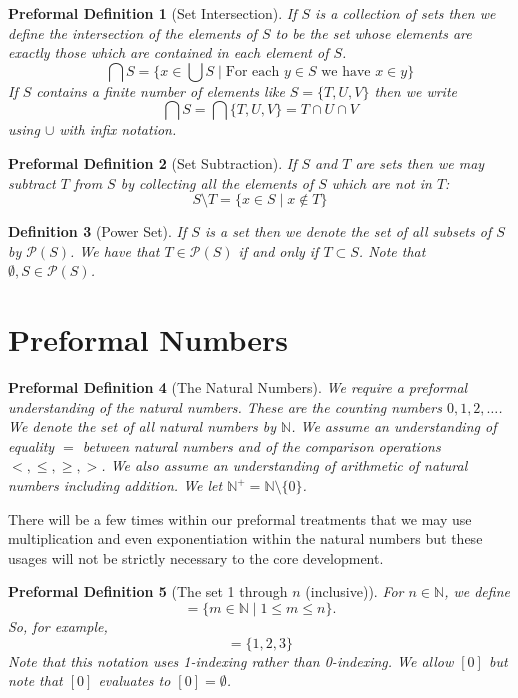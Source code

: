 \documentclass[oneside, 12pt]{book}
\theoremstyle{break}
\newtheorem{definition}{Definition}[section]
\newtheorem{preformal definition}[definition]{Preformal Definition}
\newtheorem{preformal theorem}[theorem]{Preformal Theorem}
\newcommand{\mc}[1]{\mathcal{#1}}
\newcommand{\N}[0]{\mathbb{N}}
\begin{document}
			\begin{preformal definition}[Set Intersection]
				If $S$ is a collection of sets then we define the intersection of the elements of $S$ to be the set whose elements are exactly those which are contained in each element of $S$.
				$$
				\bigcap S = \{x \in \bigcup S \mid \text{For each } y \in S \text{ we have } x \in y\}
				$$
			If $S$ contains a finite number of elements like $S = \{T, U, V\}$ then we write
				$$
				\bigcap S = \bigcap \{T, U, V\} = T \cap U \cap V
				$$
				using $\cup$ with infix notation.
			\end{preformal definition}
			
			\begin{preformal definition}[Set Subtraction]
				If $S$ and $T$ are sets then we may subtract $T$ from $S$ by collecting all the elements of $S$ which are not in $T$:
				\begin{equation*}
					S\setminus T = \{x \in S \mid x \not \in T\}
				\end{equation*}
			\end{preformal definition}
			
			\begin{definition}[Power Set]
				If $S$ is a set then we denote the set of all subsets of $S$ by $\mc{P}(S)$.
				We have that $T \in \mc{P}(S)$ if and only if $T \subset S$.
				Note that $\emptyset, S \in \mc{P}(S)$.
			\end{definition}			
			
		\section{Preformal Numbers}
			\begin{preformal definition}[The Natural Numbers]
				We require a preformal understanding of the natural numbers.
				These are the counting numbers $0, 1, 2, \ldots$. 
				We denote the set of all natural numbers by $\N$.
				We assume an understanding of equality $=$ between natural numbers and of the comparison operations $<, \le, \ge, >$.
				We also assume an understanding of arithmetic of natural numbers including addition.
				We let $\N^+ = \N \setminus\{0\}$.
			\end{preformal definition}
			There will be a few times within our preformal treatments that we may use multiplication and even exponentiation within the natural numbers but these usages will not be strictly necessary to the core development.			
			
			\begin{preformal definition}[The set 1 through $n$ (inclusive)]
				For $n \in \N$, we define
				\begin{equation*}
					[n] = \{m\in \N \mid 1 \le m \le n\}.
				\end{equation*}
				So, for example,
				\begin{equation*}
					[3] = \{1, 2, 3\}
				\end{equation*}
				Note that this notation uses 1-indexing rather than 0-indexing.
				We allow $[0]$ but note that $[0]$ evaluates to $[0] = \emptyset$.
			\end{preformal definition}
		
\end{document}
